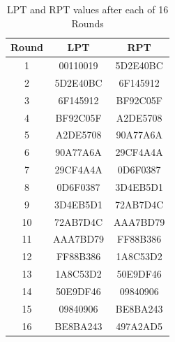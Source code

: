 \documentclass[12pt, letterpaper]{article}
\begin{document}
\begin{table}[ht]
  \centering
  
  \label{tab:sample-table}
    \begin{tabular}{|c|c|c|}
    
      \hline
    Round & LPT & RPT  \\
    \hline
    1 & 00110019 & 5D2E40BC  \\
        \hline
    2 & 5D2E40BC & 6F145912

  \\
         \hline
    3 & 6F145912 & BF92C05F  \\
         \hline
    4 & BF92C05F & A2DE5708   \\
         \hline
    5 & A2DE5708 & 90A77A6A  \\
        \hline
    6 & 90A77A6A & 29CF4A4A   \\
         \hline
    7 &  29CF4A4A & 0D6F0387

  \\
         \hline
    8 & 0D6F0387 & 3D4EB5D1

 

  \\
         \hline
    9 & 3D4EB5D1

 & 72AB7D4C

  \\
         \hline
    10 & 72AB7D4C

 & AAA7BD79

  \\
         \hline
    11 & AAA7BD79

 & FF88B386

  \\
         \hline
    12 & FF88B386

 & 1A8C53D2

  \\
         \hline
    13 & 1A8C53D2

 & 50E9DF46 \\
         \hline
    14 & 50E9DF46 & 09840906

  \\
         \hline
    15 & 09840906

 & BE8BA243

  \\
         \hline
    16 & BE8BA243

 & 497A2AD5

  \\
    \hline
  \end{tabular}
    \caption{LPT and RPT values after each of 16 Rounds}

    

\end{table}
\end{document}
